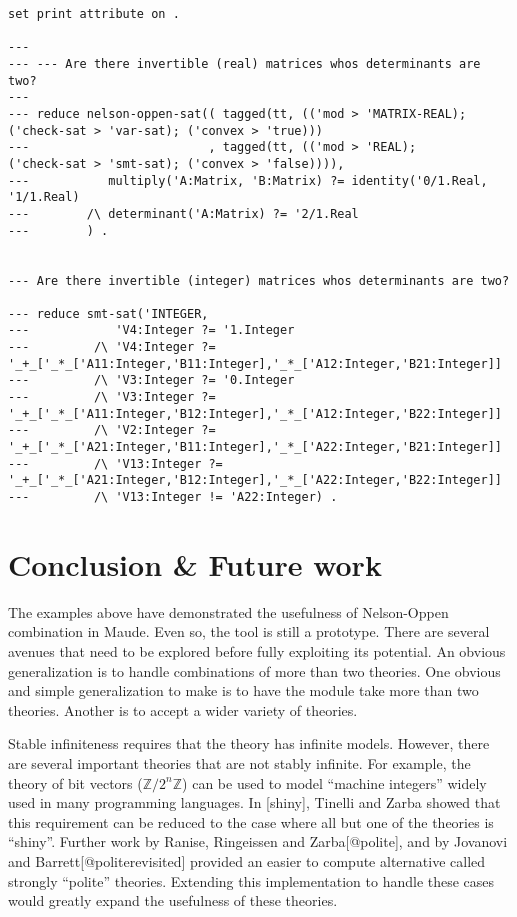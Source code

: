 \documentclass[]{article}
\newcommand \Z        {\mathbb Z}
\begin{document}
\begin{verbatim}
set print attribute on .

---
--- --- Are there invertible (real) matrices whos determinants are two?
---
--- reduce nelson-oppen-sat(( tagged(tt, (('mod > 'MATRIX-REAL);  ('check-sat > 'var-sat); ('convex > 'true)))
---                         , tagged(tt, (('mod > 'REAL);         ('check-sat > 'smt-sat); ('convex > 'false)))),
---           multiply('A:Matrix, 'B:Matrix) ?= identity('0/1.Real, '1/1.Real)
---        /\ determinant('A:Matrix) ?= '2/1.Real
---        ) .


--- Are there invertible (integer) matrices whos determinants are two?

--- reduce smt-sat('INTEGER,
---            'V4:Integer ?= '1.Integer
--- 		/\ 'V4:Integer ?= '_+_['_*_['A11:Integer,'B11:Integer],'_*_['A12:Integer,'B21:Integer]]
--- 		/\ 'V3:Integer ?= '0.Integer
--- 		/\ 'V3:Integer ?= '_+_['_*_['A11:Integer,'B12:Integer],'_*_['A12:Integer,'B22:Integer]]
--- 		/\ 'V2:Integer ?= '_+_['_*_['A21:Integer,'B11:Integer],'_*_['A22:Integer,'B21:Integer]]
--- 		/\ 'V13:Integer ?= '_+_['_*_['A21:Integer,'B12:Integer],'_*_['A22:Integer,'B22:Integer]]
--- 		/\ 'V13:Integer != 'A22:Integer) .
\end{verbatim}

\hypertarget{conclusion-future-work}{%
\section{Conclusion \& Future work}\label{conclusion-future-work}}

The examples above have demonstrated the usefulness of Nelson-Oppen
combination in Maude. Even so, the tool is still a prototype. There are
several avenues that need to be explored before fully exploiting its
potential. An obvious generalization is to handle combinations of more
than two theories. One obvious and simple generalization to make is to
have the module take more than two theories. Another is to accept a
wider variety of theories.

Stable infiniteness requires that the theory has infinite models.
However, there are several important theories that are not stably
infinite. For example, the theory of bit vectors (\(\Z / 2^n\Z\)) can be
used to model ``machine integers'' widely used in many programming
languages. In {[}shiny{]}, Tinelli and Zarba showed that this
requirement can be reduced to the case where all but one of the theories
is ``shiny''. Further work by Ranise, Ringeissen and Zarba{[}@polite{]},
and by Jovanovi and Barrett{[}@politerevisited{]} provided an easier to
compute alternative called strongly ``polite'' theories. Extending this
implementation to handle these cases would greatly expand the usefulness
of these theories.
\end{document}
